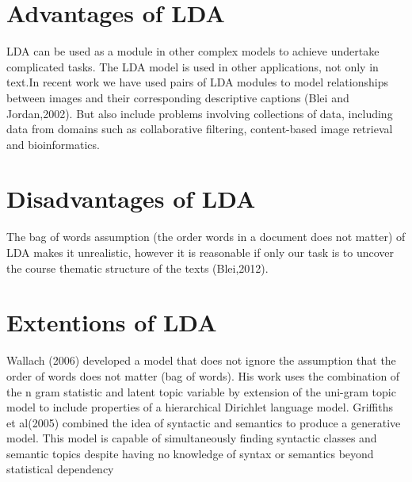 \section{Advantages of LDA} 
LDA can be used as a module in other complex models to achieve undertake complicated tasks.
The LDA model is used in other applications, not only in text.In recent work we have used pairs of LDA modules to
model relationships between images and their corresponding descriptive captions (Blei and Jordan,2002).
But also include problems involving collections of data, including data from domains such as collaborative filtering,
content-based image retrieval and bioinformatics.
\section{Disadvantages of LDA}
The bag of words assumption (the order words in a document does not matter) of LDA makes it unrealistic, however it is reasonable if only our task is to uncover the course thematic structure of the texts (Blei,2012).
\section{Extentions of LDA}
Wallach (2006) developed a model that does not ignore the assumption that the order of words does not matter (bag of words). His work uses the combination of the n gram statistic and latent topic variable by extension of the uni-gram topic model to include properties of a hierarchical Dirichlet language model.
Griffiths et al(2005) combined the idea of syntactic and semantics to produce a generative model. This model  is capable of simultaneously finding syntactic classes and semantic topics despite having no knowledge of syntax or semantics beyond statistical dependency
%
%
%
